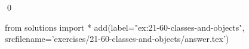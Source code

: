 
\begin{ex}
  \label{ex:21-60-classes-and-objects}
  
  \qed
\end{ex}
\begin{python0}
from solutions import *
add(label="ex:21-60-classes-and-objects",
    srcfilename='exercises/21-60-classes-and-objects/answer.tex')
\end{python0}
